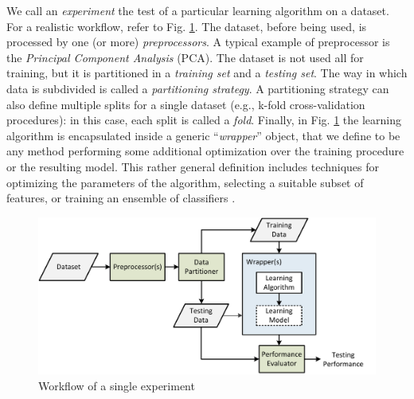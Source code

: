 We call an \textit{experiment} the test of a particular learning algorithm on a dataset. For a realistic workflow, refer to Fig. \ref{fig:workflow}. The dataset, before being used, is processed by one (or more) \textit{preprocessors}. A typical example of preprocessor is the \textit{Principal Component Analysis} (PCA). The dataset is not used all for training, but it is partitioned in a \textit{training set} and a \textit{testing set}. The way in which data is subdivided is called a \textit{partitioning strategy}. A partitioning strategy can also define multiple splits for a single dataset (e.g., k-fold cross-validation procedures): in this case, each split is called a \textit{fold}. Finally, in Fig. \ref{fig:workflow} the learning algorithm is encapsulated inside a generic ``\textit{wrapper}'' object, that we define to be any method performing some additional optimization over the training procedure or the resulting model. This rather general definition includes techniques for optimizing the parameters of the algorithm, selecting a suitable subset of features, or training an ensemble of classifiers \cite{alpaydin2004introduction}.

\begin{figure}[t]
\centering
\includegraphics[scale=0.6]{./images/Disegno3}
\caption{Workflow of a single experiment}
\label{fig:workflow}
\end{figure}